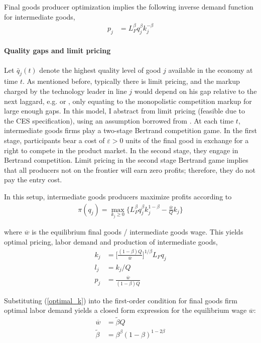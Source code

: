\documentclass[12pt,english]{article}
\theoremstyle{remark}
\begin{document}
Final goods producer optimization implies the following inverse demand function for intermediate goods, 
\begin{align*}
p_j &= L_F^{\beta} q_j^{\beta} k_j^{-\beta}	
\end{align*}

\paragraph{Quality gaps and limit pricing} Let $\bar{q}_j(t)$ denote the highest quality level of good $j$ available in the economy at time $t$. As mentioned before, typically there is limit pricing, and the markup charged by the technology leader in line $j$ would depend on his gap relative to the next laggard, e.g. \cite{baslandze_spinout_2019} or \cite{aghion_competition_2005}, only equating to the monopolistic competition markup for large enough gaps. In this model, I abstract from limit pricing (feasible due to the CES specification), using an assumption borrowed from \cite{akcigit_growth_2018}. At each time $t$, intermediate goods firms play a two-stage Bertrand competition game. In the first stage, participants bear a cost of $\varepsilon > 0$ units of the final good in exchange for a right to compete in the product market. In the second stage, they engage in Bertrand competition. Limit pricing in the second stage Bertrand game implies that all producers not on the frontier will earn zero profits; therefore, they do not pay the entry cost. 

In this setup, intermediate goods producers maximize profits according to
\begin{align}
\pi(q_j) = \max_{k_j \ge 0} \Big\{ L_F^{\beta} q_j^{\beta} k_j^{1-\beta} - \frac{\overline{w}}{Q} k_j \Big\} \label{incumbent_profit}
\end{align}

where $\overline{w}$ is the equilibrium final goods / intermediate goods wage.
This yields optimal pricing, labor demand and production of intermediate goods,
\begin{align}
k_j &= \Big[ \frac{(1-\beta) Q}{\overline{w}} \Big]^{1/\beta}L_F q_j  \label{optimal_k}\\
l_j &= k_j / Q \label{optimal_l}\\
p_j &= \frac{\overline{w}}{(1-\beta) Q} \label{optimal_p}
\end{align}

Substituting (\ref{optimal_k}) into the first-order condition for final goods firm optimal labor demand yields a closed form expression for the equilibrium wage $\overline{w}$:
\begin{align}
\overline{w} &= \tilde{\beta} Q \label{wbar} \\
\tilde{\beta} &= \beta^{\beta} (1-\beta)^{1-2\beta} \label{def_cbeta}
\end{align}
\end{document}
